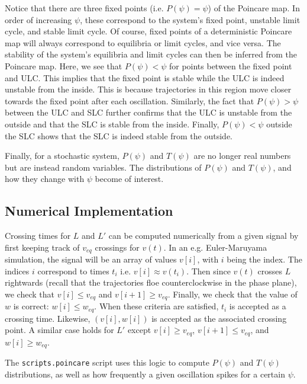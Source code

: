 \documentclass[letterpaper,12pt]{article}
\numberwithin{table}{section}
\numberwithin{figure}{section}
\numberwithin{equation}{section}
\begin{document}
\begin{flushleft}
\begin{figure}[h]
    \end{figure}
    Notice that there are three fixed points (i.e. $P(\psi) = \psi$) of the Poincare map. In order of increasing $\psi$, these correspond to the system's fixed point, unstable limit cycle, and stable limit cycle. Of course, fixed points of a deterministic Poincare map will always correspond to equilibria or limit cycles, and vice versa. The stability of the system's equilibria and limit cycles can then be inferred from the Poincare map. Here, we see that $P(\psi) < \psi$ for points between the fixed point and ULC. This implies that the fixed point is stable while the ULC is indeed unstable from the inside. This is because trajectories in this region move closer towards the fixed point after each oscillation. Similarly, the fact that $P(\psi) > \psi$ between the ULC and SLC further confirms that the ULC is unstable from the outside and that the SLC is stable from the inside. Finally, $P(\psi) < \psi$ outside the SLC shows that the SLC is indeed stable from the outside.

    Finally, for a stochastic system, $P(\psi)$ and $T(\psi)$ are no longer real numbers but are instead random variables. The distributions of $P(\psi)$ and $T(\psi)$, and how they change with $\psi$ become of interest.

    \subsection{Numerical Implementation}

    Crossing times for $L$ and $L'$ can be computed numerically from a given signal by first keeping track of $v_{eq}$ crossings for $v(t)$. In an e.g. Euler-Maruyama simulation, the signal will be an array of values $v[i]$, with $i$ being the index. The indices $i$ correspond to times $t_i$ i.e. $v[i] \approx v(t_i)$. Then since $v(t)$ crosses $L$ rightwards (recall that the trajectories floe counterclockwise in the phase plane), we check that $v[i] \leq v_{eq}$ and $v[i+1] \geq v_{eq}$. Finally, we check that the value of $w$ is correct: $w[i] \leq w_{eq}$. When these criteria are satisfied, $t_i$ is accepted as a crossing time. Likewise, $(v[i], w[i])$ is accepted as the associated crossing point. A similar case holds for $L'$ except $v[i] \geq v_{eq}$, $v[i+1] \leq v_{eq}$, and $w[i] \geq w_{eq}$.

    The \texttt{scripts.poincare} script uses this logic to compute $P(\psi)$ and $T(\psi)$ distributions, as well as how frequently a given oscillation spikes for a certain $\psi$.


\end{flushleft}
\end{document}
